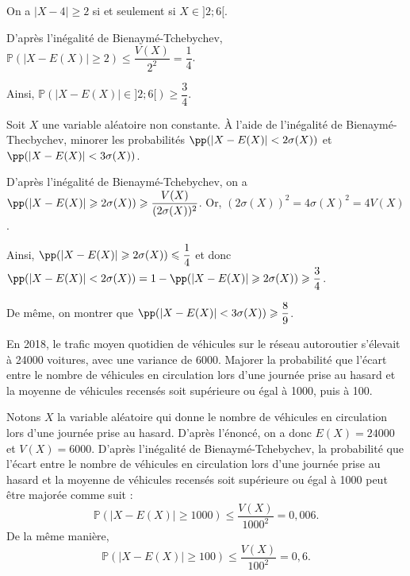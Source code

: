 \documentclass[11pt,fleqn, openany]{book} %
\begin{document}
\begin{solution}On a $|X-4|\geqslant 2$ si et seulement si $X \in ]2;6[$.

D'après l'inégalité de Bienaymé-Tchebychev, $\mathbb{P}(|X-E(X)|\geqslant 2)\leqslant \dfrac{V(X)}{2^2} =\dfrac{1}{4}$.

Ainsi, $\mathbb{P}(|X-E(X)| \in ]2;6[) \geqslant \dfrac{3}{4}$.\end{solution}

\begin{exercise}Soit $X$ une variable aléatoire non constante. À l'aide de l'inégalité de Bienaymé-Thecbychev, minorer les probabilités $\pp(|X-E(X)|<2 \sigma(X))$ et $\pp(|X-E(X)|< 3 \sigma(X))$.\end{exercise}

\begin{solution}
D'après l'inégalité de Bienaymé-Tchebychev, on a $\pp(|X-E(X)|\geqslant 2\sigma (X)) \geqslant \dfrac{V(X)}{(2\sigma(X))^2}$. Or, $(2\sigma(X))^2=4\sigma(X)^2=4V(X)$.

Ainsi, $\pp(|X-E(X)|\geqslant 2\sigma (X)) \leqslant \dfrac{1}{4}$ et donc $\pp(|X-E(X)|< 2\sigma (X)) = 1- \pp(|X-E(X)|\geqslant 2\sigma (X)) \geqslant \dfrac{3}{4}$.

De même, on montrer que $\pp(|X-E(X)|< 3\sigma (X)) \geqslant \dfrac{8}{9}$.
\end{solution}


\begin{exercise}En 2018, le trafic moyen quotidien de véhicules sur le réseau autoroutier s'élevait à 24000 voitures, avec une variance de 6000. Majorer la probabilité que l'écart entre le nombre de véhicules en circulation lors d'une journée prise au hasard et la moyenne de véhicules recensés soit supérieure ou égal à 1000, puis à 100.\end{exercise}

\begin{solution} Notons $X$ la variable aléatoire qui donne le nombre de véhicules en circulation lors d'une journée prise au hasard. D'après l'énoncé, on a donc $E(X)=24000$ et $V(X)=6000$. D'après l'inégalité de Bienaymé-Tchebychev, la probabilité que l'écart entre le nombre de véhicules en circulation lors d'une journée prise au hasard et la moyenne de véhicules recensés soit supérieure ou égal à 1000 peut être majorée comme suit :
\[ \mathbb{P}(|X-E(X)| \geqslant 1000) \leqslant \dfrac{V(X)}{1000^2} = 0,006.\]
De la même manière,
\[ \mathbb{P}(|X-E(X)| \geqslant 100) \leqslant \dfrac{V(X)}{100^2} = 0,6.\]\end{solution}
\end{document}
